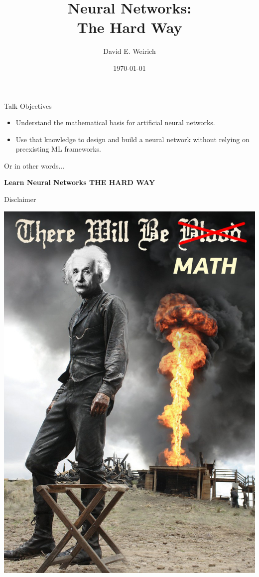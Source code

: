 \documentclass[11pt]{beamer}
\author{David E. Weirich}
\title{Neural Networks: \\ The Hard Way}
\date{\today}
\begin{document}
\begin{frame}
\titlepage
\end{frame}

\begin{frame}{Talk Objectives}

\begin{itemize}
\item Understand the mathematical basis for artificial neural networks.

\item Use that knowledge to design and build a neural network without relying on preexisting ML frameworks.
\end{itemize}

\bigskip

\pause

Or in other words...

\bigskip

\pause

\hspace{10mm}\textbf{Learn Neural Networks THE HARD WAY}

\end{frame}

\begin{frame}{Disclaimer}
\begin{center}
\includegraphics[scale=0.18]{ThereWillBeMath}
\end{center}
\end{frame}
\end{document}
